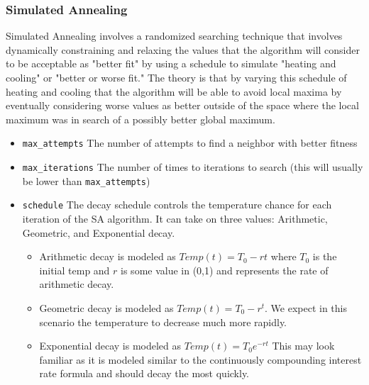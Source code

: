 \documentclass[11pt]{article}
\begin{document}
    \subsubsection*{Simulated Annealing}
    Simulated Annealing involves a randomized searching technique that involves dynamically constraining and relaxing the values that the algorithm
    will consider to be acceptable as "better fit" by using a schedule to simulate "heating and cooling" or "better or worse fit."
    The theory is that by varying this schedule of heating and cooling that the algorithm will be able to avoid local maxima
    by eventually considering worse values as better outside of the space where the local maximum was in search of a possibly
    better global maximum.
    \begin{itemize}
        \item \texttt{max\_attempts} The number of attempts to find a neighbor with better fitness
        \item \texttt{max\_iterations} The number of times to iterations to search (this will usually be lower than \texttt{max\_attempts})
        \item \texttt{schedule} The decay schedule controls the temperature chance for each iteration of the SA algorithm.
        It can take on three values: Arithmetic, Geometric, and Exponential decay.
        \begin{itemize}
            \item  Arithmetic decay is modeled as $Temp(t) = T_0 - rt$ where $T_0$ is the initial temp and $r$ is some value in (0,1) and represents the rate of arithmetic decay.
            \item Geometric decay is modeled as $Temp(t) = T_0 - r^t$. We expect in this scenario the temperature to decrease much more rapidly.
            \item Exponential decay is modeled as $Temp(t) = T_0 e^{-rt}$ This may look familiar as it is modeled similar to the continuously compounding interest rate formula and should decay the most quickly.
        \end{itemize}
    \end{itemize}
\end{document}
